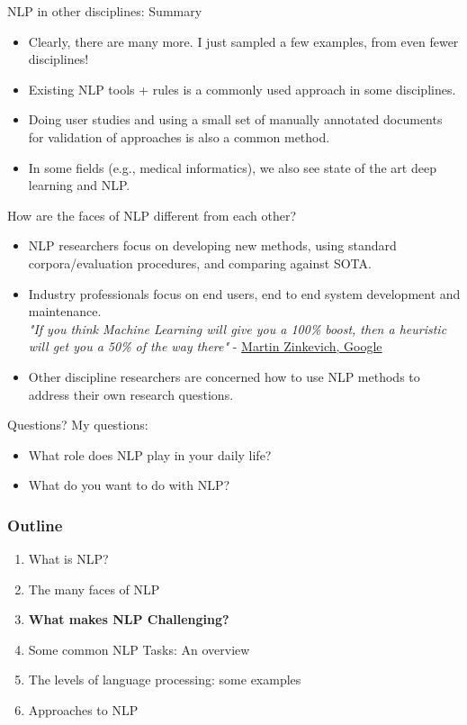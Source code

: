 \documentclass{beamer}
\begin{document}
\begin{frame}{NLP in other disciplines: Summary}
\begin{itemize}
\item Clearly, there are many more. I just sampled a few examples, from even fewer disciplines!
\item Existing NLP tools + rules is a commonly used approach in some disciplines.  
\item Doing user studies and using a small set of manually annotated documents for validation of approaches is also a common method.   
\item In some fields (e.g., medical informatics), we also see state of the art deep learning and NLP.
 \end{itemize}
 \end{frame}
 
\begin{frame}{How are the faces of NLP different from each other? }
\begin{itemize}
\item NLP researchers focus on developing new methods, using standard corpora/evaluation procedures, and comparing against SOTA. 
\item Industry professionals focus on end users, end to end system development and maintenance.
 \\ \textit{"If you think Machine Learning will give you a 100\% boost, then a heuristic will get you a 50\% of the way there"} - \href{https://developers.google.com/machine-learning/guides/rules-of-ml}{Martin Zinkevich, Google}
\item Other discipline researchers are concerned how to use NLP methods to address their own research questions.   
\end{itemize}
\end{frame}

\begin{frame}
\begin{center}
\Large Questions? \newline
\small
My questions:
\begin{itemize}
    \item What role does NLP play in your daily life?
    \item What do you want to do with NLP?
\end{itemize}
\end{center}
\end{frame}


\begin{frame}
\frametitle{Outline}
\begin{enumerate}
    \item What is NLP?
    \item The many faces of NLP
    \item \textbf{What makes NLP Challenging?}
    \item Some common NLP Tasks: An overview
    \item The levels of language processing: some examples
    \item Approaches to NLP
\end{enumerate}
\end{frame}
\end{document}
